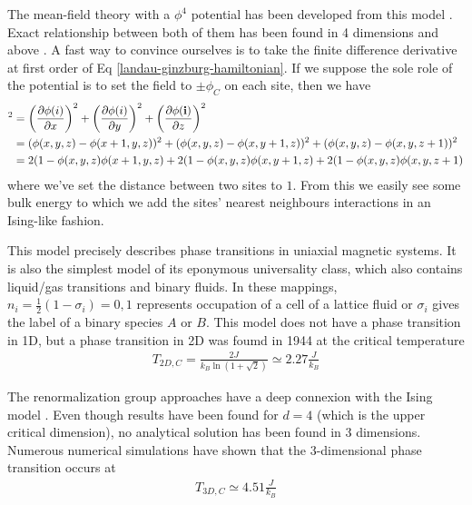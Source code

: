 The mean-field theory with a $\phi^4$ potential has been developed from this model \cite{bellac_equilibrium_2004}. Exact relationship between both of them has been found in 4 dimensions and above \cite{aizenman_proof_1981}. A fast way to convince ourselves is to take the finite difference derivative at first order of Eq \eqref{landau-ginzburg-hamiltonian}. If we suppose the sole role of the potential is to set the field to $\pm \phi_C$ on each site, then we have
\begin{align}
    [{\boldsymbol \nabla} \phi(i)]^2 &= \left( \frac{\partial \phi(i)}{\partial x} \right)^2  + \left( \frac{\partial \phi(i)}{\partial y} \right)^2 + \left( \frac{\partial \phi({\bf i})}{\partial z} \right)^2\nn
    &= (\phi(x,y,z)-\phi(x+1,y,z))^2 + (\phi(x,y,z)-\phi(x,y+1,z))^2 + (\phi(x,y,z)-\phi(x,y,z+1))^2 \nn
    &= 2 (1-\phi(x,y,z)\phi(x+1,y,z) + 2 (1-\phi(x,y,z)\phi(x,y+1,z) +2 (1-\phi(x,y,z)\phi(x,y,z+1) 
    \label{discretisation-landau}
\end{align}
where we've set the distance between two sites to $1$.
From this we easily see some bulk energy to which we add the sites' nearest neighbours interactions in an Ising-like fashion.

This model precisely describes  phase transitions in uniaxial magnetic systems\cite{de_jongh_experiments_1974,wp_wold_ising_2000,ikeda_neutron_1973}. It is also the simplest model of its eponymous universality class, which also contains liquid/gas transitions and binary fluids.
In these mappings, $n_i=\frac{1}{2}(1-\sigma_i)=0,1$ represents occupation of a cell of a lattice fluid or $\sigma_i$ gives the label of a binary species $A$ or $B$.
This model does not have a phase transition in 1D, but a phase transition in 2D was foumd in 1944\cite{onsager_crystal_1944} at the critical temperature 
\begin{align}
     T_{2D,C} = \frac{2J}{k_B \ln(1 + \sqrt{2})} \simeq 2.27 \frac{J}{k_B}
\end{align}

The renormalization group approaches have a deep connexion with the Ising model \cite{frohlich_triviality_1981,goldenfeld_lectures_2018}. Even though results have been found for $d=4$ (which is the upper critical dimension), no analytical solution has been found in 3 dimensions. Numerous numerical simulations  \cite{talapov_magnetization_1996,preis_gpu_2009} have shown that the 3-dimensional phase transition occurs at 
\begin{align}
    T_{3D,C} \simeq 4.51 \frac{J}{k_B}
\end{align}


